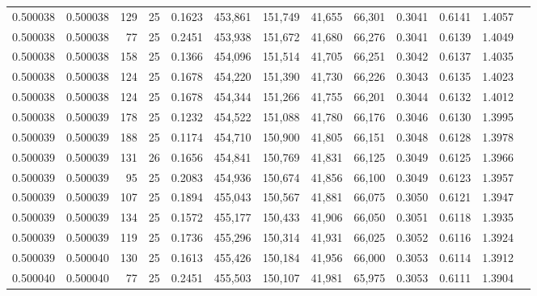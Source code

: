\begin{tabular}{rrrrrrrrrrrrr}
0.500038 & 0.500038 &   129 &  25 &                                     0.1623 & 453,861 & 151,749 &  41,655 &  66,301 & 0.3041 & 0.6141 & 1.4057 \\
0.500038 & 0.500038 &    77 &  25 &                                     0.2451 & 453,938 & 151,672 &  41,680 &  66,276 & 0.3041 & 0.6139 & 1.4049 \\
0.500038 & 0.500038 &   158 &  25 &                                     0.1366 & 454,096 & 151,514 &  41,705 &  66,251 & 0.3042 & 0.6137 & 1.4035 \\
0.500038 & 0.500038 &   124 &  25 &                                     0.1678 & 454,220 & 151,390 &  41,730 &  66,226 & 0.3043 & 0.6135 & 1.4023 \\
0.500038 & 0.500038 &   124 &  25 &                                     0.1678 & 454,344 & 151,266 &  41,755 &  66,201 & 0.3044 & 0.6132 & 1.4012 \\
0.500038 & 0.500039 &   178 &  25 &                                     0.1232 & 454,522 & 151,088 &  41,780 &  66,176 & 0.3046 & 0.6130 & 1.3995 \\
0.500039 & 0.500039 &   188 &  25 &                                     0.1174 & 454,710 & 150,900 &  41,805 &  66,151 & 0.3048 & 0.6128 & 1.3978 \\
0.500039 & 0.500039 &   131 &  26 &                                     0.1656 & 454,841 & 150,769 &  41,831 &  66,125 & 0.3049 & 0.6125 & 1.3966 \\
0.500039 & 0.500039 &    95 &  25 &                                     0.2083 & 454,936 & 150,674 &  41,856 &  66,100 & 0.3049 & 0.6123 & 1.3957 \\
0.500039 & 0.500039 &   107 &  25 &                                     0.1894 & 455,043 & 150,567 &  41,881 &  66,075 & 0.3050 & 0.6121 & 1.3947 \\
0.500039 & 0.500039 &   134 &  25 &                                     0.1572 & 455,177 & 150,433 &  41,906 &  66,050 & 0.3051 & 0.6118 & 1.3935 \\
0.500039 & 0.500039 &   119 &  25 &                                     0.1736 & 455,296 & 150,314 &  41,931 &  66,025 & 0.3052 & 0.6116 & 1.3924 \\
0.500039 & 0.500040 &   130 &  25 &                                     0.1613 & 455,426 & 150,184 &  41,956 &  66,000 & 0.3053 & 0.6114 & 1.3912 \\
0.500040 & 0.500040 &    77 &  25 &                                     0.2451 & 455,503 & 150,107 &  41,981 &  65,975 & 0.3053 & 0.6111 & 1.3904 \\

\end{tabular}
